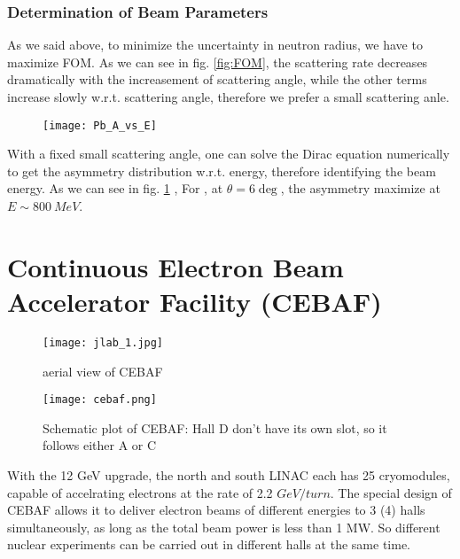 \subsubsection{Determination of Beam Parameters}
As we said above, to minimize the uncertainty in neutron radius, we have to 
maximize FOM. As we can see in fig. \ref{fig:FOM}, the scattering rate decreases
dramatically with the increasement of scattering angle, while the other terms
increase slowly w.r.t. scattering angle, therefore we prefer a small scattering
anle.

\begin{figure}[h!]
    \texttt{[image: Pb\_A\_vs\_E]}
    \label{fig:Pb_A_vs_E}
\end{figure}
With a fixed small scattering angle, one can solve the Dirac equation numerically
to get the asymmetry distribution w.r.t. energy, therefore identifying the 
beam energy. As we can see in fig. \ref{fig:Pb_A_vs_E} \cite{PhysRevC.57.3430}, 
For \Pb, at $\theta = 6\deg$, the asymmetry maximize at $E \sim 800 \ MeV$.

\section{Continuous Electron Beam Accelerator Facility (CEBAF)}
\begin{figure}[h!]
    \texttt{[image: jlab\_1.jpg]}
    \caption{aerial view of CEBAF} 
\end{figure}
\begin{figure}[h!]
    \texttt{[image: cebaf.png]}
    \caption{Schematic plot of CEBAF: Hall D don't have its own slot, so it 
    follows either A or C} 
\end{figure}
With the 12 GeV upgrade, the north and south LINAC each has 25 cryomodules, 
capable of accelrating electrons at the rate of 2.2 $GeV/turn$. The special
design of CEBAF allows it to deliver electron beams of different energies to
3 (4) halls simultaneously, as long as the total beam power is less than 1 MW.
So different nuclear experiments can be carried out in different halls at the 
same time.

